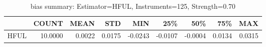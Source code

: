 \begin{table}[ht]
\centering
\caption{bias summary: Estimator=HFUL, Instruments=125, Strength=0.70}
\begin{tabular}{lrrrrrrrr}
\toprule
 & COUNT & MEAN & STD & MIN & 25\% & 50\% & 75\% & MAX \\
\midrule
HFUL & 10.0000 & 0.0022 & 0.0175 & -0.0243 & -0.0107 & -0.0004 & 0.0134 & 0.0315 \\
\bottomrule
\end{tabular}
\end{table}
